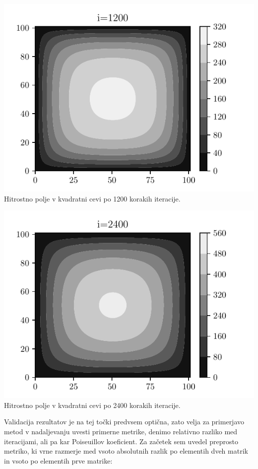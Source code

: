 \begin{center}
    \begin{minipage}{0.45\textwidth}
        \centering
    \includegraphics[width=\textwidth]{../old/0-kvadratna_i1200.pdf}
    {Hitrostno polje v kvadratni cevi po 1200 korakih iteracije.}
    \end{minipage}\hfill
    \begin{minipage}{0.45\textwidth}
        \centering
        \includegraphics[width=1\textwidth]{../old/0-kvadratna_i2400.pdf}
    {Hitrostno polje v kvadratni cevi po 2400 korakih iteracije.}
    \end{minipage}
\end{center}
Validacija rezultatov je na tej točki predvsem optična, zato velja za primerjavo metod v nadaljevanju uvesti primerne metrike, denimo relativno razliko med iteracijami, ali pa kar Poiseuillov koeficient. Za začetek sem uvedel preprosto metriko, ki vrne razmerje med vsoto absolutnih razlik po elementih dveh matrik in vsoto po elementih prve matrike:
